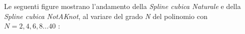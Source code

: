Le seguenti figure mostrano l'andamento della \textit{Spline cubica Naturale} e della \textit{Spline cubica NotAKnot}, al variare del grado \textit{N} del polinomio con $N=2,4,6,8...40$ :\\\
	\begin{figure}
		 \quad
	\end{figure}
	\begin{figure}
		 \quad
	\end{figure}
	\begin{figure}
		 \quad
	\end{figure}
